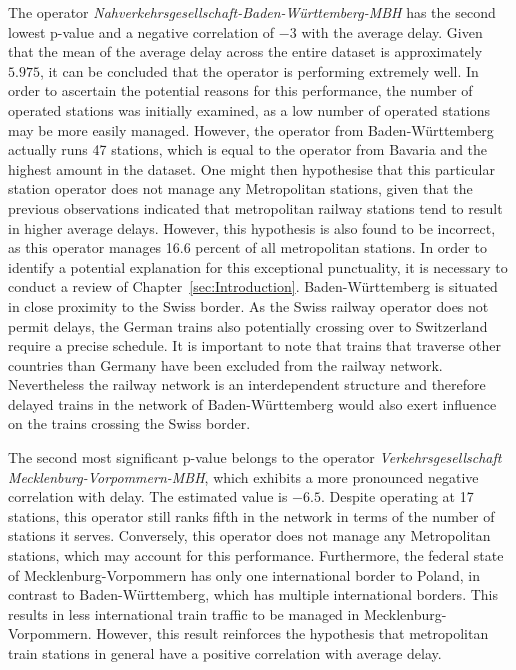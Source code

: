 \documentclass[12pt,a4paper]{article}
\begin{document}
The operator \textit{Nahverkehrsgesellschaft-Baden-Württemberg-MBH} has the second lowest p-value and a negative correlation of $-3$ with the average delay. 
Given that the mean of the average delay across the entire dataset is approximately $5.975$, it can be concluded that the operator is performing extremely well. 
In order to ascertain the potential reasons for this performance, the number of operated stations was initially examined, as a low number of operated stations may be more easily managed. 
However, the operator from Baden-Württemberg actually runs 47 stations, which is equal to the operator from Bavaria and the highest amount in the dataset. 
One might then hypothesise that this particular station operator does not manage any Metropolitan stations, given that the previous observations indicated that metropolitan railway stations tend to result in higher average delays. 
However, this hypothesis is also found to be incorrect, as this operator manages 16.6 percent of all metropolitan stations. 
In order to identify a potential explanation for this exceptional punctuality, it is necessary to conduct a review of Chapter~\ref{sec:Introduction}. 
Baden-Württemberg is situated in close proximity to the Swiss border. As the Swiss railway operator does not permit delays, the German trains also potentially crossing over to Switzerland require a precise schedule. 
It is important to note that trains that traverse other countries than Germany have been excluded from the railway network. Nevertheless the railway network is an interdependent structure and therefore delayed trains in the network of Baden-Württemberg would also exert influence on the trains crossing the Swiss border.

The second most significant p-value belongs to the operator \textit{Verkehrsgesellschaft Mecklenburg-Vorpommern-MBH}, which exhibits a more pronounced negative correlation with delay. 
The estimated value is $-6.5$. Despite operating at 17 stations, this operator still ranks fifth in the network in terms of the number of stations it serves. 
Conversely, this operator does not manage any Metropolitan stations, which may account for this performance. 
Furthermore, the federal state of Mecklenburg-Vorpommern has only one international border to Poland, in contrast to Baden-Württemberg, which has multiple international borders. 
This results in less international train traffic to be managed in Mecklenburg-Vorpommern. However, this result reinforces the hypothesis that metropolitan train stations in general have a positive correlation with average delay.
\end{document}
